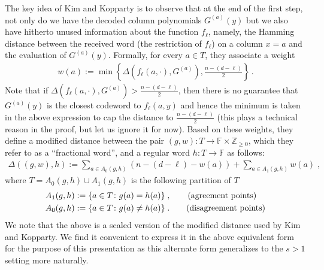 \documentclass{article}
\def\Integer{\mathbb{Z}}
\def\Field{\mathbb{F}}
\let\Z\Integer
\let\F\Field
\begin{document}
	The key idea of Kim and Kopparty is to observe that at the end of the
	first step, not only do we have the decoded column polynomials
	$G^{(a)}(y)$ but we also have hitherto unused  information about
	the function $f_{\ell}$, namely, the Hamming distance between the
	received word (the restriction of $f_{\ell}$) on a column $x = a$ and
	the evaluation of $G^{(a)}(y)$.
	Formally, for every $a \in T$, they associate a
	weight
	\begin{align}
		w(a) := \min\left\{{\Delta\left(f_{\ell}(a, \cdot), G^{(a)}\right)},\frac{n
			-(d-\ell)}{2}  \right\}\, .\label{eq:KKweight}
	\end{align}
	Note that if $\Delta\left(f_{\ell}(a, \cdot), G^{(a)}\right) > \frac{n
		-(d-\ell)}{2}$, then there is no guarantee that $G^{(a)}(y)$ is the
	closest codeword to $f_{\ell}(a,y)$ and hence the minimum is taken in
	the above expression to cap the distance to $\frac{n
		-(d-\ell)}{2}$ (this plays a technical reason in the proof, but let
	us ignore it for now). 
	Based on these weights, they define a modified distance between the
	pair $(g,w)\colon T \to \F \times \Z_{\geq 0}$, which they refer to as
	a ``fractional word'',  and a regular word $h \colon T \to \F$ as
	follows:
	\begin{align}
		\Delta((g,w), h) := \sum_{a \in A_0(g,h)} (n-(d-\ell) - w(a)) + \sum_{a
			\in A_1(g,h)} w(a) \;,\label{eq:KKdistance}
	\end{align}
	where $T= A_0(g,h) \cup A_1(g,h)$ is the following partition of $T$
	\begin{align*}
		A_1(g,h) &:= \{ a \in T \colon g(a) = h(a) \}\;,
		\tag*{\text{(agreement points)}}\\
		A_0(g,h) &:= \{ a \in T \colon g(a) \neq h(a)\}\;. \tag*{\text{(disagreement points)}}
	\end{align*}
	We note that the above is a scaled version of the modified distance
	used by Kim and Kopparty. We find it convenient to express it in the
	above equivalent form for the purpose of this presentation as this
	alternate form generalizes to the $s>1$ setting more naturally.
	
\end{document}
